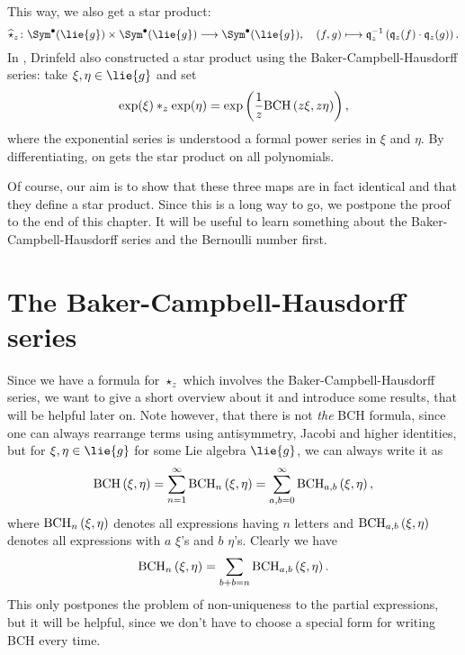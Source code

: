 This way, we also get a star product:
\begin{equation}
	\label{Alg:DeformedStar}
	\widehat{\star}_z
	\colon
	\Sym^{\bullet}(\lie{g})
	\times
	\Sym^{\bullet}(\lie{g})
	\longrightarrow
	\Sym^{\bullet}(\lie{g})
	, \quad
	(f,g)
	\longmapsto
	\mathfrak{q}_z^{-1} 
	\left(
		\mathfrak{q}_z(f) \cdot \mathfrak{q}_z(g)
	\right).
\end{equation}
In \cite{drinfeld:1981a}, Drinfeld also constructed a star product using the 
Baker-Campbell-Hausdorff series: take $\xi, \eta \in \lie{g}$ and set
\begin{equation}
	\label{Alg:DrinfeldStar}
	\exp(\xi) \ast_z \exp(\eta)
	=
	\exp \left(
		\frac{1}{z}
		\mathrm{BCH}\left(z \xi, z \eta\right)
	\right),
\end{equation}
where the exponential series is understood a formal power series in $\xi$ and 
$\eta$. By differentiating, on gets the star product on all polynomials.


Of course, our aim is to show that these three maps are in fact identical and 
that they define a star product. Since this is a long way to go, we postpone 
the proof to the end of this chapter. It will be useful to learn something 
about the Baker-Campbell-Hausdorff series and the Bernoulli number first.



\section{The Baker-Campbell-Hausdorff series}
\label{sec:chap3_BCH}

Since we have a formula for $\star_z$ which involves the
Baker-Campbell-Hausdorff series, we want to give a short overview
about it and introduce some results, that will be helpful later on.
Note however, that there is not \emph{the} BCH formula, since one can always 
rearrange terms using antisymmetry, Jacobi and higher identities, but for 
$\xi, \eta \in \lie{g}$ for some Lie algebra $\lie{g}$, we can always write it 
as
\begin{equation}
	\label{Alg:NamesOfBCH}
	\mathrm{BCH}\left(\xi, \eta\right)
	=
	\sum\limits_{n = 1}^{\infty}
	\mathrm{BCH}_{n}\left(\xi, \eta\right)
	=
	\sum\limits_{a,b = 0}^{\infty}
	\mathrm{BCH}_{a, b}\left(\xi, \eta\right),
\end{equation}
where $\mathrm{BCH}_{n}\left(\xi, \eta\right)$ denotes all expressions having $n$ letters and 
$\mathrm{BCH}_{a, b}\left(\xi, \eta\right)$ denotes all expressions with $a$ $\xi$'s and $b$ 
$\eta$'s. Clearly we have
\begin{equation*}
	\mathrm{BCH}_{n}\left(\xi, \eta\right)
	=
	\sum\limits_{b + b = n}
	\mathrm{BCH}_{a, b}\left(\xi, \eta\right).
\end{equation*}
This only postpones the problem of non-uniqueness to the partial expressions, 
but it will be helpful, since we don't have to choose a special form for 
writing BCH every time.



